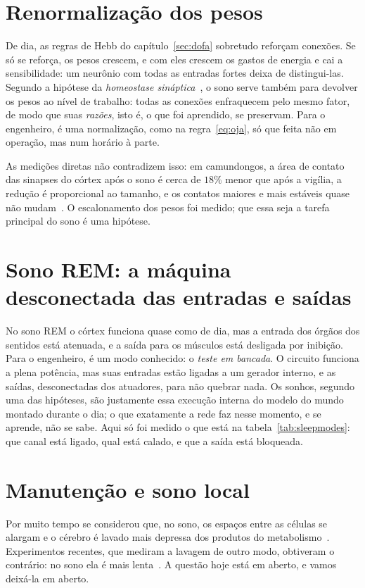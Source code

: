 \section{Renormalização dos pesos}

De dia, as regras de Hebb do capítulo~\ref{sec:dofa} sobretudo reforçam conexões. Se só se reforça, os pesos crescem, e com eles crescem os gastos de energia e cai a sensibilidade: um neurônio com todas as entradas fortes deixa de distingui-las. Segundo a hipótese da \emph{homeostase sináptica}~\cite{TononiCirelli2014}, o sono serve também para devolver os pesos ao nível de trabalho: todas as conexões enfraquecem pelo mesmo fator, de modo que suas \emph{razões}, isto é, o que foi aprendido, se preservam. Para o engenheiro, é uma normalização, como na regra~\eqref{eq:oja}, só que feita não em operação, mas num horário à parte.

As medições diretas não contradizem isso: em camundongos, a área de contato das sinapses do córtex após o sono é cerca de $18\%$ menor que após a vigília, a redução é proporcional ao tamanho, e os contatos maiores e mais estáveis quase não mudam~\cite{deVivo2017}. O escalonamento dos pesos foi medido; que essa seja a tarefa principal do sono é uma hipótese.

\section{Sono REM: a máquina desconectada das entradas e saídas}

No sono REM o córtex funciona quase como de dia, mas a entrada dos órgãos dos sentidos está atenuada, e a saída para os músculos está desligada por inibição. Para o engenheiro, é um modo conhecido: o \emph{teste em bancada}. O circuito funciona a plena potência, mas suas entradas estão ligadas a um gerador interno, e as saídas, desconectadas dos atuadores, para não quebrar nada. Os sonhos, segundo uma das hipóteses, são justamente essa execução interna do modelo do mundo montado durante o dia; o que exatamente a rede faz nesse momento, e se aprende, não se sabe. Aqui só foi medido o que está na tabela~\ref{tab:sleepmodes}: que canal está ligado, qual está calado, e que a saída está bloqueada.

\section{Manutenção e sono local}

Por muito tempo se considerou que, no sono, os espaços entre as células se alargam e o cérebro é lavado mais depressa dos produtos do metabolismo~\cite{Xie2013}. Experimentos recentes, que mediram a lavagem de outro modo, obtiveram o contrário: no sono ela é mais lenta~\cite{Miao2024}. A questão hoje está em aberto, e vamos deixá-la em aberto.

